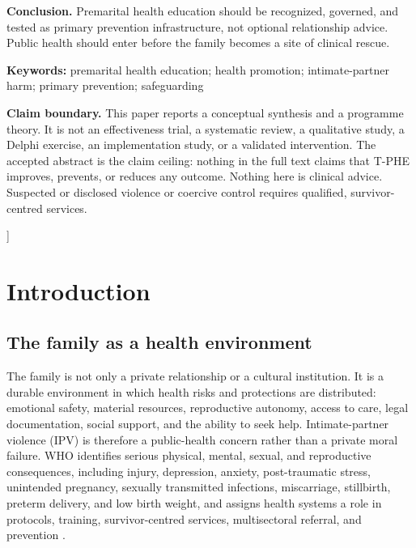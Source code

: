 \documentclass[10pt,twocolumn]{article}
\newcommand{\tphe}{T\mbox{-}PHE}
\begin{document}
\begin{center}
\begin{minipage}{0.92\textwidth}
\textbf{Conclusion.} Premarital health education should be recognized, governed, and tested as primary prevention infrastructure, not optional relationship advice. Public health should enter before the family becomes a site of clinical rescue.\par\vspace{2pt}
\textbf{Keywords:} premarital health education; health promotion; intimate-partner harm; primary prevention; safeguarding
\end{minipage}
\end{center}
\vspace{3mm}
\begin{center}
\begin{minipage}{0.92\textwidth}
\footnotesize
\noindent\textbf{Claim boundary.} This paper reports a conceptual synthesis and a programme theory. It is not an effectiveness trial, a systematic review, a qualitative study, a Delphi exercise, an implementation study, or a validated intervention. The accepted abstract is the claim ceiling: nothing in the full text claims that \tphe{} improves, prevents, or reduces any outcome. Nothing here is clinical advice. Suspected or disclosed violence or coercive control requires qualified, survivor-centred services.
\end{minipage}
\end{center}
\vspace{4mm}
]

\section{Introduction}

\subsection{The family as a health environment}
The family is not only a private relationship or a cultural institution. It is a durable environment in which health risks and protections are distributed: emotional safety, material resources, reproductive autonomy, access to care, legal documentation, social support, and the ability to seek help. Intimate-partner violence (IPV) is therefore a public-health concern rather than a private moral failure. WHO identifies serious physical, mental, sexual, and reproductive consequences, including injury, depression, anxiety, post-traumatic stress, unintended pregnancy, sexually transmitted infections, miscarriage, stillbirth, preterm delivery, and low birth weight, and assigns health systems a role in protocols, training, survivor-centred services, multisectoral referral, and prevention \cite{who_vaw_2026}.
\end{document}
